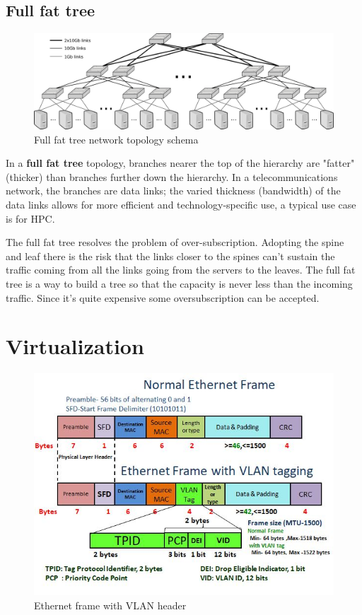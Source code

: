 \subsection{Full fat tree}
\begin{figure}[htbp]
   \centering
   \includegraphics{images/fullfattree_network.png}
   \caption{Full fat tree network topology schema}
   \label{fig:fullfattree_network}
\end{figure}
In a \textbf{full fat tree} topology, branches nearer the top of the hierarchy are "fatter" (thicker) than branches further down the hierarchy. In a telecommunications network, the branches are data links; the varied thickness (bandwidth) of the data links allows for more efficient and technology-specific use, a typical use case is for HPC.

The full fat tree resolves the problem of over-subscription. Adopting
the spine and leaf there is the risk that the links closer to the spines can’t sustain the traffic coming from all the links going from the servers to the leaves. The full fat tree is a way to build a tree so that the capacity is never
less than the incoming traffic. Since it's quite expensive some oversubscription can be accepted.

\section{Virtualization}

\begin{figure}[htbp]
   \centering
   \includegraphics{images/vlan_header.jpg}
   \caption{Ethernet frame with VLAN header}
   \label{fig:vlan_header}
\end{figure}

